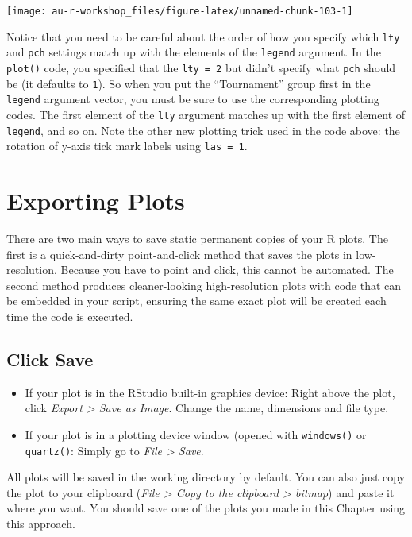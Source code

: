 \documentclass[]{book}
\providecommand{\tightlist}{%
  \setlength{\itemsep}{0pt}\setlength{\parskip}{0pt}}
\theoremstyle{definition}
\theoremstyle{definition}
\theoremstyle{definition}
\theoremstyle{remark}
\begin{document}
\begin{center}\texttt{[image: au-r-workshop\_files/figure-latex/unnamed-chunk-103-1]} \end{center}

Notice that you need to be careful about the order of how you specify
which \texttt{lty} and \texttt{pch} settings match up with the elements
of the \texttt{legend} argument. In the \texttt{plot()} code, you
specified that the \texttt{lty\ =\ 2} but didn't specify what
\texttt{pch} should be (it defaults to \texttt{1}). So when you put the
``Tournament'' group first in the \texttt{legend} argument vector, you
must be sure to use the corresponding plotting codes. The first element
of the \texttt{lty} argument matches up with the first element of
\texttt{legend}, and so on. Note the other new plotting trick used in
the code above: the rotation of y-axis tick mark labels using
\texttt{las\ =\ 1}.

\section{Exporting Plots}\label{exporting-plots}

There are two main ways to save static permanent copies of your R plots.
The first is a quick-and-dirty point-and-click method that saves the
plots in low-resolution. Because you have to point and click, this
cannot be automated. The second method produces cleaner-looking
high-resolution plots with code that can be embedded in your script,
ensuring the same exact plot will be created each time the code is
executed.

\subsection{Click Save}\label{click-save}

\begin{itemize}
\tightlist
\item
  If your plot is in the RStudio built-in graphics device: Right above
  the plot, click \emph{Export \textgreater{} Save as Image}. Change the
  name, dimensions and file type.
\item
  If your plot is in a plotting device window (opened with
  \texttt{windows()} or \texttt{quartz()}: Simply go to \emph{File
  \textgreater{} Save}.
\end{itemize}

All plots will be saved in the working directory by default. You can
also just copy the plot to your clipboard (\emph{File \textgreater{}
Copy to the clipboard \textgreater{} bitmap}) and paste it where you
want. You should save one of the plots you made in this Chapter using
this approach.
\end{document}
